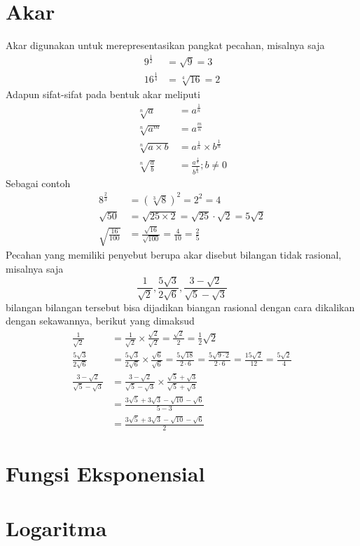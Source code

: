 \documentclass{article}
\begin{document}
\section{Akar}
Akar digunakan untuk merepresentasikan pangkat pecahan, misalnya saja
\[
\begin{aligned}
    9^{\frac{1}{2}} &= \sqrt{9} = 3\\
    16^{\frac{1}{4}} &= \sqrt[4]{16} = 2
\end{aligned}
\]
Adapun sifat-sifat pada bentuk akar meliputi
\[
\begin{aligned}
    \sqrt[n]{a} &= a^{\frac{1}{n}}\\
    \sqrt[n]{a^m} &= a^{\frac{m}{n}}\\
    \sqrt[n]{a \times b} &=a^{\frac{1}{n}} \times b^{\frac{1}{n}}\\
    \sqrt[n]{\frac{a}{b}} &=\frac{a^{\frac{1}{n}}}{b^{\frac{1}{n}}} ;b \not=0
\end{aligned}
\]
Sebagai contoh 
\[
\begin{aligned}
    8^{\frac{2}{3}} &=(\sqrt[3]{8})^2 =2^2=4\\
    \sqrt{50}&=\sqrt{25 \times2}=\sqrt{25}\cdot\sqrt{2}=5\sqrt{2}\\
    \sqrt{\frac{16}{100}} &=\frac{\sqrt{16}}{\sqrt{100}}=\frac{4}{10}=\frac{2}{5}
\end{aligned}
\]
Pecahan yang memiliki penyebut berupa akar disebut bilangan tidak rasional, misalnya saja
\[
\frac{1}{\sqrt{2}},\frac{5\sqrt{3}}{2\sqrt{6}},\frac{3-\sqrt{2}}{\sqrt{5}-\sqrt{3}}
\]
bilangan bilangan tersebut bisa dijadikan biangan rasional dengan cara dikalikan dengan sekawannya, berikut yang dimaksud
\[
\begin{aligned}
    \frac{1}{\sqrt{2}} &= \frac{1}{\sqrt{2}} \times \frac{\sqrt{2}}{\sqrt{2}}=\frac{\sqrt{2}}{2}=\frac{1}{2}\sqrt{2}\\
    \frac{5\sqrt{3}}{2\sqrt{6}} &= \frac{5\sqrt{3}}{2\sqrt{6}} \times \frac{\sqrt{6}}{\sqrt{6}}=\frac{5\sqrt{18}}{2 \cdot 6}=\frac{5\sqrt{9\cdot 2}}{2 \cdot 6}=\frac{15\sqrt{2}}{12}=\frac{5\sqrt{2}}{4}\\
    \frac{3-\sqrt{2}}{\sqrt{5}-\sqrt{3}} &=\frac{3-\sqrt{2}}{\sqrt{5}-\sqrt{3}}\times \frac{\sqrt{5}+\sqrt{3}}{\sqrt{5}+\sqrt{3}}\\
    &=\frac{3\sqrt{5}+3\sqrt{3}-\sqrt{10}-\sqrt{6}}{5-3}\\
    &=\frac{3\sqrt{5}+3\sqrt{3}-\sqrt{10}-\sqrt{6}}{2}
\end{aligned}
\]
\section{Fungsi Eksponensial}
\section{Logaritma}
\end{document}
